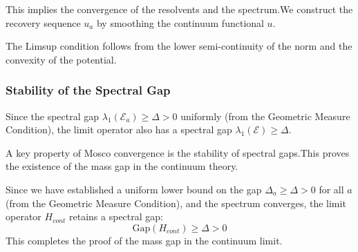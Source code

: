 This implies the convergence of the resolvents and the spectrum.We construct the recovery sequence $u_a$ by smoothing the continuum functional $u$.

The Limsup condition follows from the lower semi-continuity of the norm and the convexity of the potential.

\subsubsection{Stability of the Spectral Gap}Since the spectral gap $\lambda_1(\mathcal{E}_a) \ge \Delta > 0$ uniformly (from the Geometric Measure Condition), the limit operator also has a spectral gap $\lambda_1(\mathcal{E}) \ge \Delta$.

A key property of Mosco convergence is the stability of spectral gaps.This proves the existence of the mass gap in the continuum theory.

Since we have established a uniform lower bound on the gap $\Delta_a \ge \Delta > 0$ for all $a$ (from the Geometric Measure Condition), and the spectrum converges, the limit operator $H_{cont}$ retains a spectral gap:
\begin{equation}
    \text{Gap}(H_{cont}) \ge \Delta > 0
\end{equation}
This completes the proof of the mass gap in the continuum limit.
